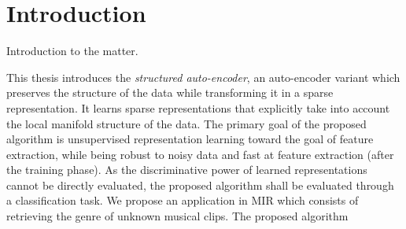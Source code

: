 \documentclass[a4paper,12pt,oneside]{report}
\begin{document}
\tableofcontents
\pagestyle{fancy}





\chapter*{Introduction}

{\color{red} Introduction to the matter.}


This thesis introduces the \textit{structured auto-encoder}, an auto-encoder variant which preserves the structure of the data while transforming it in a sparse representation. It learns sparse representations that explicitly take into account the local manifold structure of the data.
The primary goal of the proposed algorithm is unsupervised representation learning toward the goal of feature extraction, while being robust to noisy data and fast at feature extraction (after the training phase). As the discriminative power of learned representations cannot be directly evaluated, the proposed algorithm shall be evaluated through a classification task.
We propose an application in \gls{MIR} which consists of retrieving the genre of unknown musical clips. The proposed algorithm 

\end{document}
